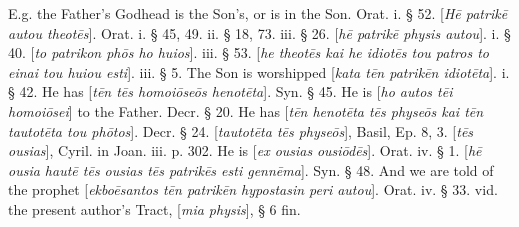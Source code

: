 E.g. the Father's Godhead is the Son's, or is in
the Son. Orat. i. § 52. [\emph{H\={e} patrik\={e} autou theot\={e}s}].
Orat. i. § 45, 49. ii. § 18, 73. iii. § 26. [\emph{h\={e} patrik\={e}
physis autou}]. i. § 40. [\emph{to patrikon ph\={o}s ho huios}].
iii. § 53. [\emph{he theot\={e}s kai he idiot\={e}s tou patros to
einai tou huiou esti}]. iii. § 5. The Son is worshipped [\emph{kata t\={e}n
patrik\={e}n idiot\={e}ta}]. i. § 42. He has [\emph{t\={e}n
t\={e}s homoi\={o}se\={o}s henot\={e}ta}]. Syn. § 45.
He is [\emph{ho autos t\={e}i homoi\={o}sei}] to the Father.
Decr. § 20. He has [\emph{t\={e}n henot\={e}ta t\={e}s physe\={o}s
kai t\={e}n tautot\={e}ta tou ph\={o}tos}]. Decr. § 24. [\emph{tautot\={e}ta
t\={e}s physe\={o}s}], Basil, Ep. 8, 3. [\emph{t\={e}s ousias}],
Cyril. in Joan. iii. p. 302. He is [\emph{ex ousias} \emph{ousi\={o}d\={e}s}].
Orat. iv. § 1. [\emph{h\={e} ousia haut\={e} t\={e}s ousias t\={e}s
patrik\={e}s esti genn\={e}ma}]. Syn. § 48. And we are told
of the prophet [\emph{ekbo\={e}santos t\={e}n patrik\={e}n
hypostasin peri autou}]. Orat. iv. § 33. vid. the present author's
Tract, [\emph{mia physis}], § 6 fin.

